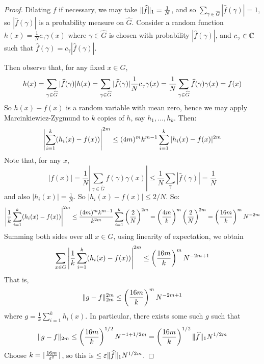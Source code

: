 \documentclass[10pt,a4paper]{article}
\let\E\relax
\DeclareMathOperator*{\E}{\raisebox{-0.45em}{\text{\huge $\mathds{E}$}}}
\begin{document}
\begin{proof}
  Dilating $f$ if necessary, we may take $\lVert\widehat{f}\rVert_1 = \frac{1}{N}$, and so $\sum_{\gamma \in \hat{G}}|\hat{f}(\gamma)| = 1$, so $|\hat{f}(\gamma)|$ is a probability measure on $\hat{G}$. Consider a random function $h(x) = \frac{1}{N}c_\gamma \gamma(x)$ where $\gamma \in \hat{G}$ is chosen with probability $|\hat{f}(\gamma)|$, and $c_\gamma \in \mathbb{C}$ such that $\hat{f}(\gamma) = c_\gamma |\hat{f}(\gamma)|$.

  Then observe that, for any fixed $x \in G$, \[\E h(x) = \sum_{\gamma \in \hat{G}}|\hat{f}(\gamma)|h(x) = \sum_{\gamma \in \hat{G}}|\hat{f}(\gamma)|\frac{1}{N}c_\gamma \gamma(x) = \frac{1}{N}\sum_{\gamma \in \hat{G}} \hat{f}(\gamma)\gamma(x) = f(x)\]
  So $h(x) - f(x)$ is a random variable with mean zero, hence we may apply Marcinkiewicz-Zygmund to $k$ copies of $h$, say $h_1, \ldots, h_k$. Then:
  \[\E\left|\sum_{i=1}^k(h_i(x) - f(x))\right|^{2m} \leq (4m)^m k^{m-1}\E\sum_{i=1}^k |h_i(x)-f(x)|^{2m}\]
  Note that, for any $x$,
  \[|f(x)| = \frac{1}{N}\left|\sum_{\gamma \in \hat{G}}\hat{f}(\gamma)\gamma(x)\right| \leq \frac{1}{N}\sum_{\gamma}|\hat{f}(\gamma)| = \frac{1}{N}\]
  and also $|h_i(x)| = \frac{1}{N}$. So $|h_i(x)-f(x)| \leq 2/N$. So:
  \[\E \left|\frac{1}{k}\sum_{i=1}^k (h_i(x)-f(x))\right|^{2m} \leq \frac{(4m)^m k^{m-1}}{k^{2m}}\E\sum_{i=1}^k \left(\frac{2}{N}\right)^{2m} = \left(\frac{4m}{k}\right)^m\left(\frac{2}{N}\right)^{2m} = \left(\frac{16m}{k}\right)^m N^{-2m}\]
  Summing both sides over all $x \in G$, using linearity of expectation, we obtain
  \[\E \sum_{x \in G}\left|\frac{1}{k}\sum_{i=1}^k (h_i(x)-f(x))\right|^{2m} \leq \left(\frac{16m}{k}\right)^m N^{-2m+1}\]
  That is,
  \[\E \norm{g-f}_{2m}^{2m} \leq \left(\frac{16m}{k}\right)^m N^{-2m+1}\]
  where $g = \frac{1}{k}\sum_{i=1}^k h_i(x)$. In particular, there exists some such $g$ such that
  \[\lVert g-f\rVert_{2m} \leq \left(\frac{16m}{k}\right)^{1/2} N^{-1+1/2m} = \left(\frac{16m}{k}\right)^{1/2} \lVert\widehat{f}\rVert_1 N^{1/2m}\]
  Choose $k = \lceil \frac{16m}{\varepsilon^2} \rceil$, so this is $\leq \varepsilon \lVert\widehat{f}\rVert_1 N^{1/2m}$.
\end{proof}
\end{document}
